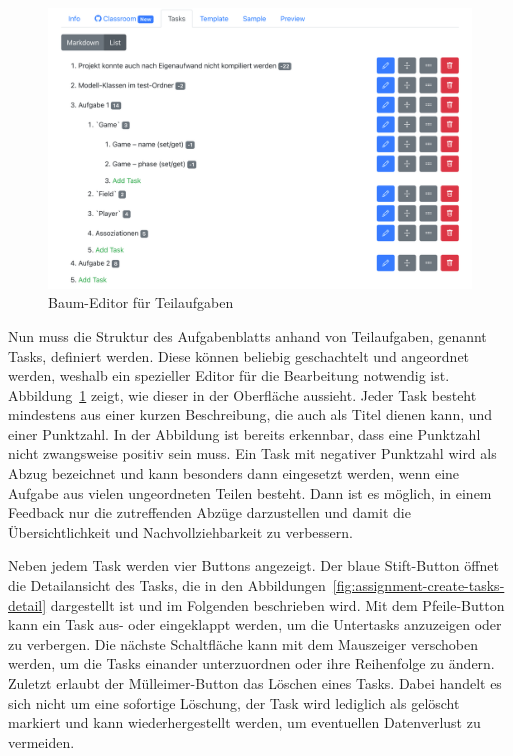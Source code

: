\begin{figure}
    \centering
    \includegraphics[width=\textwidth]{images/assignment-create-tasks-list}
    \caption{Baum-Editor für Teilaufgaben}
    \label{fig:assignment-create-tasks-list}
\end{figure}

Nun muss die Struktur des Aufgabenblatts anhand von Teilaufgaben, genannt Tasks, definiert werden.
Diese können beliebig geschachtelt und angeordnet werden, weshalb ein spezieller Editor für die Bearbeitung notwendig ist.
Abbildung~\ref{fig:assignment-create-tasks-list} zeigt, wie dieser in der Oberfläche aussieht.
Jeder Task besteht mindestens aus einer kurzen Beschreibung, die auch als Titel dienen kann, und einer Punktzahl.
In der Abbildung ist bereits erkennbar, dass eine Punktzahl nicht zwangsweise positiv sein muss.
Ein Task mit negativer Punktzahl wird als Abzug bezeichnet und kann besonders dann eingesetzt werden, wenn eine Aufgabe aus vielen ungeordneten Teilen besteht.
Dann ist es möglich, in einem Feedback nur die zutreffenden Abzüge darzustellen und damit die Übersichtlichkeit und Nachvollziehbarkeit zu verbessern.

Neben jedem Task werden vier Buttons angezeigt.
Der blaue Stift-Button öffnet die Detailansicht des Tasks, die in den Abbildungen~\ref{fig:assignment-create-tasks-detail} dargestellt ist und im Folgenden beschrieben wird.
Mit dem Pfeile-Button kann ein Task aus- oder eingeklappt werden, um die Untertasks anzuzeigen oder zu verbergen.
Die nächste Schaltfläche kann mit dem Mauszeiger verschoben werden, um die Tasks einander unterzuordnen oder ihre Reihenfolge zu ändern.
Zuletzt erlaubt der Mülleimer-Button das Löschen eines Tasks.
Dabei handelt es sich nicht um eine sofortige Löschung, der Task wird lediglich als gelöscht markiert und kann wiederhergestellt werden, um eventuellen Datenverlust zu vermeiden.

